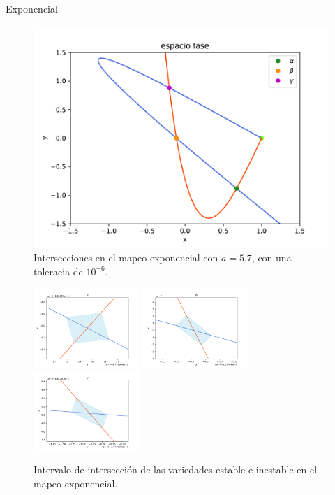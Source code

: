 \documentclass[11pt]{beamer}
\theoremstyle{definition}
\begin{document}
\begin{frame}{Exponencial}
\begin{figure}[H]
	\centering
	\includegraphics[scale=0.5]{cruces_jung1}
	\caption{Intersecciones en el mapeo exponencial con $a=5.7$, con una toleracia de $10^{-6}$.}
	\label{jung_cortes}
\end{figure}
\end{frame}

\begin{frame}
\begin{figure}
	\includegraphics[width=40mm]{cruce_a}
	\includegraphics[width=40mm]{cruce_b}
	\includegraphics[width=40mm]{cruce_c}
	\caption{Intervalo de intersección de las variedades estable e inestable en el mapeo exponencial.} 
	\label{cruces_jung}
\end{figure}
\end{frame}
\end{document}
